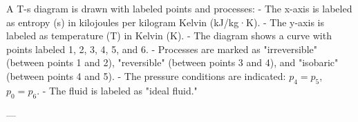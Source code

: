 A T-s diagram is drawn with labeled points and processes:  
- The x-axis is labeled as entropy (s) in kilojoules per kilogram Kelvin (kJ/kg·K).  
- The y-axis is labeled as temperature (T) in Kelvin (K).  
- The diagram shows a curve with points labeled 1, 2, 3, 4, 5, and 6.  
- Processes are marked as "irreversible" (between points 1 and 2), "reversible" (between points 3 and 4), and "isobaric" (between points 4 and 5).  
- The pressure conditions are indicated: \( p_4 = p_5 \), \( p_0 = p_6 \).  
- The fluid is labeled as "ideal fluid."  

---